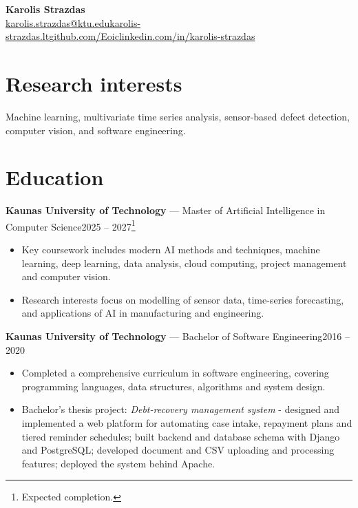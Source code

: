 \documentclass[10pt,a4paper]{article}
\makeatletter
\newcommand{\entry}[3]{\noindent\textbf{#1} — #2\hfill #3\\}
\newcommand{\Name}{Karolis Strazdas}
\newcommand{\Email}{karolis.strazdas@ktu.edu}
\newcommand{\Website}{https://karolis-strazdas.lt}
\newcommand{\GitHub}{https://github.com/Eoic}
\newcommand{\LinkedIn}{https://www.linkedin.com/in/karolis-strazdas/}
\makeatother
\begin{document}
\pagestyle{plain}  %

\begin{center}
{\Huge\bfseries \Name}\\[0.8em]
{\small \href{mailto:\Email}{\Email}\quad\textbullet\quad \href{\Website}{karolis-strazdas.lt}\quad\textbullet\quad \href{\GitHub}{github.com/Eoic}\quad\textbullet\quad \href{\LinkedIn}{linkedin.com/in/karolis-strazdas}}
\end{center}

\vspace{-0.5em}


\section*{Research interests}
Machine learning, multivariate time series analysis, sensor-based defect detection, computer vision, and software engineering.

\section*{Education}
\entry{Kaunas University of Technology}{Master of Artificial Intelligence in Computer Science}{2025 -- 2027\footnote{Expected completion.}}
\vspace{-0.8em}
\begin{itemize}[leftmargin=*, topsep=0em]
  \item Key coursework includes modern AI methods and techniques, machine learning, deep learning, data analysis, cloud computing, project management and computer vision.
  \item Research interests focus on modelling of sensor data, time-series forecasting, and applications of AI in manufacturing and engineering.
\end{itemize}

\entry{Kaunas University of Technology}{Bachelor of Software Engineering}{2016 -- 2020}
\vspace{-0.8em}
\begin{itemize}[leftmargin=*, topsep=0em]
  \item Completed a comprehensive curriculum in software engineering, covering programming languages, data structures, algorithms and system design.
  \item Bachelor's thesis project: \emph{Debt-recovery management system} - designed and implemented a web platform for automating case intake, repayment plans and tiered reminder schedules; built backend and database schema with Django and PostgreSQL; developed document and CSV uploading and processing features; deployed the system behind Apache.
\end{itemize}
\end{document}
